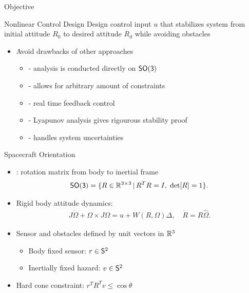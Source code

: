 \begin{frame}{Objective} %

    \begin{block}{Nonlinear Control Design}
        Design control input \( u \) that stabilizes system from initial attitude \( R_0 \) to desired attitude \( R_d \) while avoiding obstacles
    \end{block}
    \pause
    \vs
    \begin{itemize}
        \item Avoid drawbacks of other approaches 
        \begin{itemize}
            \item {} - analysis is conducted directly on \( \SO \) 
            \item {} - allows for arbitrary amount of constraints
            \item {} - real time feedback control
            \item {} - Lyapunov analysis gives rigourous stability proof
            \item {} - handles system uncertainties
        \end{itemize}
    \end{itemize}
\end{frame}


\begin{frame}{Spacecraft Orientation} %

\begin{itemize}

    \item {}: rotation matrix from body to inertial frame
     \[\SO =  \{R\in\R^{3\times 3}\,|\, R^TR=I,\;\mathrm{det}[R]=1\} . \]
    \item Rigid body attitude dynamics:
    \begin{gather*}
        J\dot\Omega + \Omega\times J\Omega = u+W(R,\Omega)\Delta , \quad \dot R = R\hat\Omega .
    \end{gather*}

    \item Sensor and obstacles defined by unit vectors in \( \R^3 \) 
        \begin{itemize}
            \item Body fixed sensor: \( r \in \S^2\)
            \item Inertially fixed hazard: \( v \in \S^2 \)
        \end{itemize} 
    \vs
    \item Hard cone constraint: \( r^T R^T v \leq \cos \theta \)
    
\end{itemize}
\end{frame}   %

